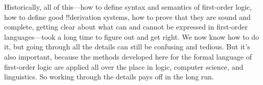 \documentclass[../../../include/open-logic-section]{subfiles}
\begin{document}
Historically, all of this---how to define syntax and semantics of
first-order logic, how to define good !!{derivation} systems, how to prove that
they are sound and complete, getting clear about what can and cannot
be expressed in first-order languages---took a long time to figure out
and get right.  We now know how to do it, but going through all the
details can still be confusing and tedious.  But it's also important,
because the methods developed here for the formal language of
first-order logic are applied all over the place in logic, computer
science, and linguistics. So working through the details pays off in
the long run.
\end{document}
